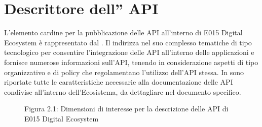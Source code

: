 \documentclass[letterpaper,10pt,italian]{sphinxmanual}
\begin{document}
\chapter{Descrittore dell” API}
\label{\detokenize{descriptor1:capitolo2}}\label{\detokenize{descriptor1::doc}}\label{\detokenize{descriptor1:descrittore-dell-api}}
L’elemento cardine per la pubblicazione delle API all’interno di E015 Digital Ecosystem è rappresentato dal .
Il  indirizza nel suo complesso tematiche di tipo tecnologico \textendash{} per consentire l’integrazione delle API all’interno delle applicazioni \textendash{}e fornisce numerose informazioni sull’API, tenendo in considerazione  aspetti di tipo organizzativo e di policy che regolamentano l’utilizzo dell’API stessa.
In {\hyperref[\detokenize{descriptor1:dimensioninterest}]{}} sono riportate tutte le caratteristiche necessarie alla documentazione delle API condivise all’interno dell’Ecosistema, da dettagliare nel documento specifico.

\begin{figure}[htbp]
\centering
\capstart

\noindent{}
\caption{Figura 2.1: Dimensioni di interesse per la descrizione delle API di E015 Digital Ecosystem}\label{\detokenize{descriptor1:dimensioninterest}}\label{\detokenize{descriptor1:id1}}\end{figure}
\end{document}
